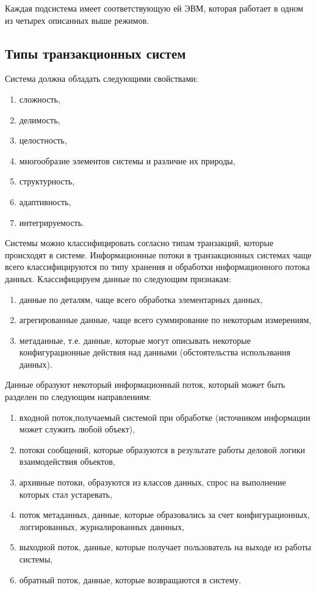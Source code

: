 Каждая подсистема имеет соответствующую ей ЭВМ, которая работает в одном из четырех описанных выше режимов.

\subsection{Типы транзакционных систем}\label{sec:ch2/sec1/sub1}

Система должна обладать следующими свойствами:
\begin{enumerate}
	\item сложность,
	\item делимость,
	\item целостность,
	\item многообразие элементов системы и различие их природы,
	\item структурность,
	\item адаптивность,
	\item интегрируемость. 
\end{enumerate}
Системы можно классифицировать согласно типам транзакций, которые происходят в системе.
Информационные потоки в транзакционных системах чаще всего классифицируются по типу хранения и обработки информационного потока данных. Классифицируем данные по следующим признакам:
\begin{enumerate}
	\item данные по деталям, чаще всего обработка элементарных данных,
	\item агрегированные данные, чаще всего суммирование по некоторым измерениям,
	\item метаданные, т.е. данные, которые могут описывать некоторые конфигурационные действия над данными (обстоятельства использвания данных).
\end{enumerate}
Данные образуют некоторый информационный поток, который может быть разделен по следующим направлениям:
\begin{enumerate}
	\item входной поток,получаемый системой при обработке (источником информации может служить любой объект),
	\item потоки сообщений, которые образуются в результате работы деловой логики взаимодействия объектов,
	\item архивные потоки, образуются из классов данных, спрос на выполнение которых стал устаревать,
	\item поток метаданных, данные, которые образовались за счет конфигурационных, логгированных, журналированных даннных,
	\item выходной поток, данные, которые получает пользователь на выходе из работы системы,
	\item обратный поток, данные, которые возвращаются в систему.
\end{enumerate}

